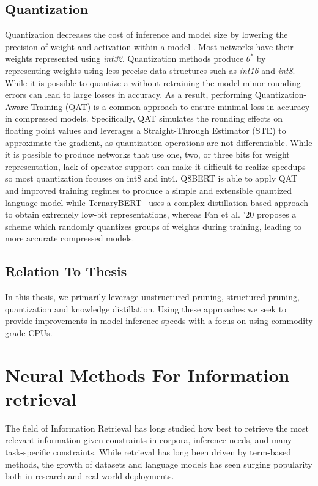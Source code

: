 \subsection{Quantization}
Quantization decreases the cost of inference and model size by lowering the precision of weight and activation within a model \cite{Courbariaux2016BinarizedNN}. Most networks have their weights represented using \textit{int32}. Quantization methods produce $\theta^*$ by representing weights using less precise data structures such as \textit{int16} and \textit{int8}. While it is possible to quantize a without retraining the model minor rounding errors can lead to large losses in accuracy. As a result, performing  Quantization-Aware Training (QAT) is a common approach to ensure minimal loss in accuracy in compressed models. Specifically, QAT simulates the rounding effects on floating point values and leverages a Straight-Through Estimator (STE) to approximate the gradient, as quantization operations are not differentiable. While it is possible to produce networks that use one, two, or three bits for weight representation, lack of operator support can make it difficult to realize speedups so most quantization focuses on int8 and int4. Q8BERT \cite{Zafrir2019Q8BERTQ8} is able to apply QAT and improved training regimes to produce a simple and extensible quantized language model while TernaryBERT~\cite{zhang2020ternarybert} uses a complex distillation-based approach to obtain extremely low-bit representations, whereas Fan et al. '20 \cite{fan2020training} proposes a scheme which randomly quantizes groups of weights during training, leading to more accurate compressed models.
\subsection{Relation To Thesis}
In this thesis, we primarily leverage unstructured pruning, structured pruning, quantization and knowledge distillation. Using these approaches we seek to provide improvements in model inference speeds with a focus on using commodity grade CPUs. 
\section{Neural Methods For Information retrieval}
The field of Information Retrieval has long studied how best to retrieve the most relevant information given constraints in corpora, inference needs, and many task-specific constraints. While retrieval has long been driven by term-based methods, the growth of datasets and language models has seen surging popularity both in research and real-world deployments.  
